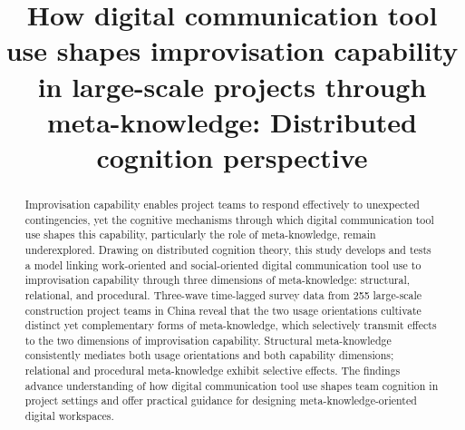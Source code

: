 \documentclass[authoryear,preprint,review,times,10pt]{elsarticle}
\begin{document}
\modulolinenumbers[1]  %
\runninglinenumbers  %
\begin{frontmatter}

\title{How digital communication tool use shapes improvisation capability in large-scale projects through meta-knowledge: Distributed cognition perspective}

%
%
%
%
%

\begin{abstract}
Improvisation capability enables project teams to respond effectively to unexpected contingencies, yet the cognitive mechanisms through which digital communication tool use shapes this capability, particularly the role of meta-knowledge, remain underexplored. Drawing on distributed cognition theory, this study develops and tests a model linking work-oriented and social-oriented digital communication tool use to improvisation capability through three dimensions of meta-knowledge: structural, relational, and procedural. Three-wave time-lagged survey data from 255 large-scale construction project teams in China reveal that the two usage orientations cultivate distinct yet complementary forms of meta-knowledge, which selectively transmit effects to the two dimensions of improvisation capability. Structural meta-knowledge consistently mediates both usage orientations and both capability dimensions; relational and procedural meta-knowledge exhibit selective effects. The findings advance understanding of how digital communication tool use shapes team cognition in project settings and offer practical guidance for designing meta-knowledge-oriented digital workspaces.
\end{abstract}


\end{frontmatter}
\end{document}
